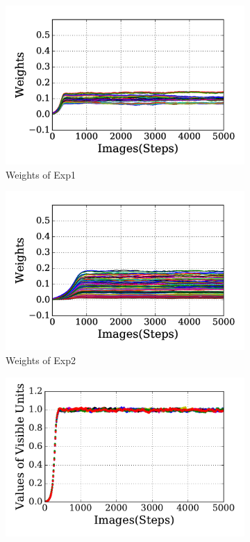 \begin{figure}
	\centering
	\begin{subfigure}[t]{0.48\textwidth}
		\includegraphics[width=\textwidth]{pics_sdlm/30_exp_RBM/exp1_weights_non.png}
		\caption{Weights of Exp1}
	\end{subfigure}
	\begin{subfigure}[t]{0.48\textwidth}
		\includegraphics[width=\textwidth]{pics_sdlm/30_exp_RBM/exp2_weights_non.png}
		\caption{Weights of Exp2}
	\end{subfigure}
	\begin{subfigure}[t]{0.48\textwidth}
		\includegraphics[width=\textwidth]{pics_sdlm/30_exp_RBM/exp1_recon_non.pdf}

\end{subfigure}
\end{figure}
